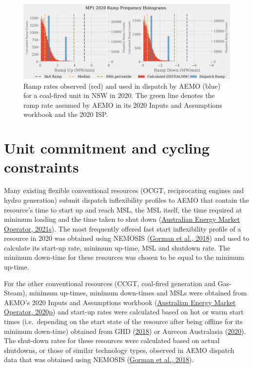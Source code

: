 \documentclass[12pt,a4paper,]{report}
\begin{document}
\begin{figure}
\hypertarget{fig:ramp_rate_comparison}{%
\centering
\includegraphics{source/figures/coal_market_upper_ramps.png}
\caption[Observed, submitted and ISP ramp rates for a NSW coal-fired
unit]{Ramp rates observed (red) and used in dispatch by AEMO (blue) for
a coal-fired unit in NSW in 2020. The green line denotes the ramp rate
assumed by AEMO in its 2020 Inputs and Assumptions workbook and the 2020
ISP.}\label{fig:ramp_rate_comparison}
}
\end{figure}

\hypertarget{unit-commitment-and-cycling-constraints}{%
\section{Unit commitment and cycling
constraints}\label{unit-commitment-and-cycling-constraints}}

Many existing flexible conventional resources (OCGT, reciprocating
engines and hydro generation) submit dispatch inflexibility profiles to
AEMO that contain the resource's time to start up and reach MSL, the MSL
itself, the time required at minimum loading and the time taken to shut
down
(\protect\hyperlink{ref-australianenergymarketoperatorFastStartInflexibilityProfile2021}{Australian
Energy Market Operator, 2021s}). The most frequently offered fast start
inflexibility profile of a resource in 2020 was obtained using NEMOSIS
(\protect\hyperlink{ref-gormanNEMOSISNEMOpen2018}{Gorman et al., 2018})
and used to calculate its start-up rate, minimum up-time, MSL and
shutdown rate. The minimum down-time for these resources was chosen to
be equal to the minimum up-time.

For the other conventional resources (CCGT, coal-fired generation and
Gas-Steam), minimum up-times, minimum down-times and MSLs were obtained
from AEMO's 2020 Inputs and Assumptions workbook
(\protect\hyperlink{ref-australianenergymarketoperator2020InputsAssumptions2020}{Australian
Energy Market Operator, 2020p}) and start-up rates were calculated based
on hot or warm start times (i.e.~depending on the start state of the
resource after being offline for its minimum down-time) obtained from
GHD (\protect\hyperlink{ref-ghd2018AEMOCost2018}{2018}) or Aurecon
Australasia
(\protect\hyperlink{ref-aureconaustralasiaGeneratorTechnicalCost2020}{2020}).
The shut-down rates for these resources were calculated based on actual
shutdowns, or those of similar technology types, observed in AEMO
dispatch data that was obtained using NEMOSIS
(\protect\hyperlink{ref-gormanNEMOSISNEMOpen2018}{Gorman et al., 2018}).
\end{document}
